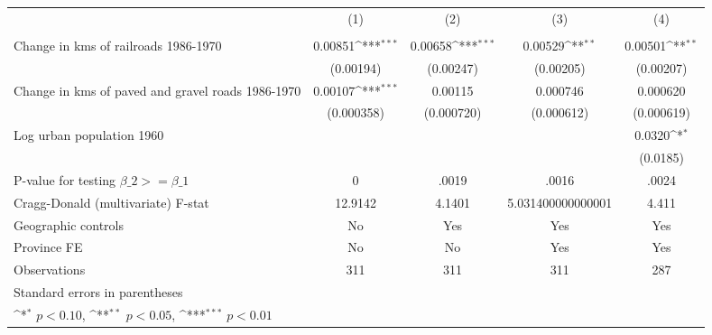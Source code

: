 {
\def\sym#1{\ifmmode^{#1}\else\(^{#1}\)\fi}
\begin{tabular}{l*{4}{c}}
\hline\hline
                &\multicolumn{1}{c}{(1)}&\multicolumn{1}{c}{(2)}&\multicolumn{1}{c}{(3)}&\multicolumn{1}{c}{(4)}\\
                &\multicolumn{1}{c}{}&\multicolumn{1}{c}{}&\multicolumn{1}{c}{}&\multicolumn{1}{c}{}\\
\hline
Change in kms of railroads 1986-1970&  0.00851\sym{***}&  0.00658\sym{***}&  0.00529\sym{**} &  0.00501\sym{**} \\
                &(0.00194)         &(0.00247)         &(0.00205)         &(0.00207)         \\
[1em]
Change in kms of paved and gravel roads 1986-1970&  0.00107\sym{***}&  0.00115         & 0.000746         & 0.000620         \\
                &(0.000358)         &(0.000720)         &(0.000612)         &(0.000619)         \\
[1em]
Log urban population 1960&                  &                  &                  &   0.0320\sym{*}  \\
                &                  &                  &                  & (0.0185)         \\
\hline
P-value for testing $\beta\_{2} >= \beta\_{1}$&        0         &    .0019         &    .0016         &    .0024         \\
Cragg-Donald (multivariate) F-stat&  12.9142         &   4.1401         &5.031400000000001         &    4.411         \\
Geographic controls&       No         &      Yes         &      Yes         &      Yes         \\
Province FE     &       No         &       No         &      Yes         &      Yes         \\
Observations    &      311         &      311         &      311         &      287         \\
\hline\hline
\multicolumn{5}{l}{\footnotesize Standard errors in parentheses}\\
\multicolumn{5}{l}{\footnotesize \sym{*} \(p<0.10\), \sym{**} \(p<0.05\), \sym{***} \(p<0.01\)}\\
\end{tabular}
}
